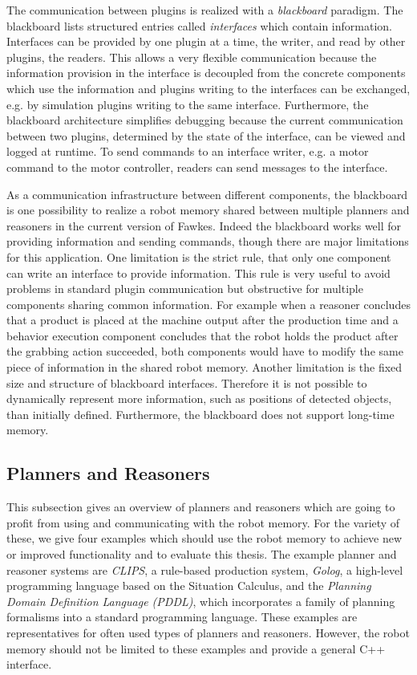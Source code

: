 \documentclass[a4paper,11pt]{article}
\begin{document}
The communication between plugins is realized with a \emph{blackboard}
paradigm. The blackboard lists structured entries called
\emph{interfaces} which contain information. Interfaces can be
provided by one plugin at a time, the writer, and read by other
plugins, the readers. This allows a very flexible communication
because the information provision in the interface is decoupled from
the concrete components which use the information and plugins writing
to the interfaces can be exchanged, e.g. by simulation plugins writing
to the same interface. Furthermore, the blackboard architecture
simplifies debugging because the current communication between two
plugins, determined by the state of the interface, can be viewed and
logged at runtime. To send commands to an interface writer, e.g. a
motor command to the motor controller, readers can send messages to
the interface.

As a communication infrastructure between different components, the
blackboard is one possibility to realize a robot memory shared between
multiple planners and reasoners in the current version of
Fawkes. Indeed the blackboard works well for providing information and
sending commands, though there are major limitations for this
application. One limitation is the strict rule, that only one
component can write an interface to provide information. This rule is
very useful to avoid problems in standard plugin communication but
obstructive for multiple components sharing common information. For
example when a reasoner concludes that a product is placed at the
machine output after the production time and a behavior execution
component concludes that the robot holds the product after the grabbing
action succeeded, both components would have to modify the same piece
of information in the shared robot memory. Another limitation is the
fixed size and structure of blackboard interfaces. Therefore it is not
possible to dynamically represent more information, such as positions
of detected objects, than initially defined. Furthermore, the blackboard
does not support long-time memory.

\subsection{Planners and Reasoners}
\label{sec:planners}
This subsection gives an overview of planners and reasoners which are
going to profit from using and communicating with the robot
memory. For the variety of these, we give four
examples which should use the robot memory to achieve new or improved
functionality and to evaluate this thesis. The example planner and
reasoner systems are \emph{CLIPS}, a rule-based production system,
\emph{Golog}, a high-level programming language based on the Situation
Calculus, and the \emph{Planning Domain Definition Language (PDDL)},
which incorporates a family of planning formalisms into a standard
programming language. These examples are representatives for often
used types of planners and reasoners. However, the robot memory should
not be limited to these examples and provide a general C++ interface.
\end{document}
